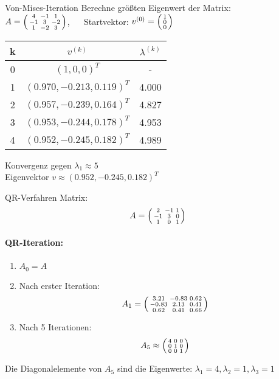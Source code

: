 \begin{example2}{Von-Mises-Iteration}
Berechne größten Eigenwert der Matrix:
\vspace{2mm}\\
$A = \begin{psmallmatrix}
4 & -1 & 1\\
-1 & 3 & -2\\
1 & -2 & 3
\end{psmallmatrix}$, $\quad$
Startvektor: $v^{(0)} = \begin{psmallmatrix}1\\ 0\\ 0\end{psmallmatrix}$

\begin{center}
\begin{tabular}{c|c|c}
k & $v^{(k)}$ & $\lambda^{(k)}$ \\\hline
0 & $(1, 0, 0)^T$ & -\\
1 & $(0.970, -0.213, 0.119)^T$ & 4.000\\
2 & $(0.957, -0.239, 0.164)^T$ & 4.827\\
3 & $(0.953, -0.244, 0.178)^T$ & 4.953\\
4 & $(0.952, -0.245, 0.182)^T$ & 4.989
\end{tabular}
\end{center}

Konvergenz gegen $\lambda_1 \approx 5$ \\ Eigenvektor $v \approx (0.952, -0.245, 0.182)^T$
\end{example2}

\begin{example2}{QR-Verfahren}
Matrix:
$$A = \begin{psmallmatrix}
2 & -1 & 1\\
-1 & 3 & 0\\
1 & 0 & 1
\end{psmallmatrix}$$

\paragraph{QR-Iteration:}
\begin{enumerate}
    \item $A_0 = A$
    \item Nach erster Iteration:
    $$A_1 = \begin{psmallmatrix}
    3.21 & -0.83 & 0.62\\
    -0.83 & 2.13 & 0.41\\
    0.62 & 0.41 & 0.66
    \end{psmallmatrix}$$
    \item Nach 5 Iterationen:
    $$A_5 \approx \begin{psmallmatrix}
    4 & 0 & 0\\
    0 & 1 & 0\\
    0 & 0 & 1
    \end{psmallmatrix}$$
\end{enumerate}

Die Diagonalelemente von $A_5$ sind die Eigenwerte: $\lambda_1 = 4, \lambda_2 = 1, \lambda_3 = 1$
\end{example2}